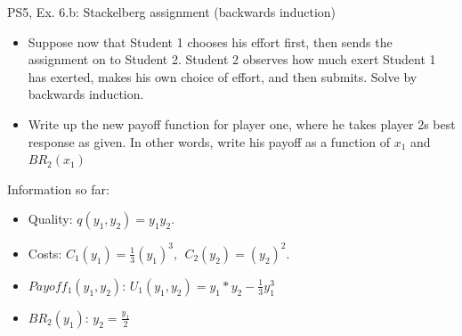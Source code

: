 \begin{frame}{PS5, Ex. 6.b: Stackelberg assignment (backwards induction)}
    \begin{itemize}
    \item[(b)] Suppose now that Student 1 chooses his effort first, then sends the assignment on to Student 2. Student 2 observes how much exert Student 1 has exerted, makes his own choice of effort, and then submits. Solve by backwards induction.
    \end{itemize}
    \vfill\null
  \begin{multicols}{2}
    \begin{itemize}
      \item[(Step 1)] Write up the new payoff function for player one, where he takes player 2s best response as given. In other words, write his payoff as a function of \begin{math}x_1\end{math} and \begin{math}BR_2(x_1)\end{math}
    \end{itemize}
    \vfill\null \columnbreak
    Information so far:
    \begin{itemize}
        \item[1] Quality: $q(y_1, y_2) = y_1y_2.$\\
        \item[2] Costs: $C_1(y_1) = \frac{1}{3}(y_1)^3,\ \ C_2(y_2) = (y_2)^2.$\\
        \item[3] $Payoff_1(y_1,y_2)$: $U_1(y_1,y_2) = y_1*y_2-\frac{1}{3}y_1^3$ \\
        \item[4] $BR_2(y_1)$: $y_2 = \frac{y_1}{2}$ \\
    \end{itemize}
    \vfill\null
  \end{multicols}
\end{frame}

